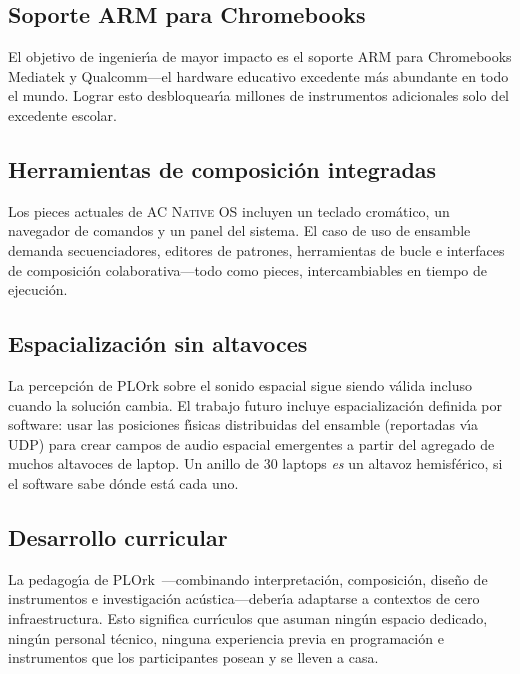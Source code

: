\documentclass[10pt,letterpaper,twocolumn]{article}
\newcommand{\acos}{\textsc{AC Native OS}}
\begin{document}
\subsection{Soporte ARM para Chromebooks}

El objetivo de ingenier\'{\i}a de mayor impacto es el soporte ARM para Chromebooks Mediatek y Qualcomm---el hardware educativo excedente m\'{a}s abundante en todo el mundo. Lograr esto desbloquear\'{\i}a millones de instrumentos adicionales solo del excedente escolar.

\subsection{Herramientas de composici\'{o}n integradas}

Los pieces actuales de \acos{} incluyen un teclado crom\'{a}tico, un navegador de comandos y un panel del sistema. El caso de uso de ensamble demanda secuenciadores, editores de patrones, herramientas de bucle e interfaces de composici\'{o}n colaborativa---todo como pieces, intercambiables en tiempo de ejecuci\'{o}n.

\subsection{Espacializaci\'{o}n sin altavoces}

La percepci\'{o}n de PLOrk sobre el sonido espacial sigue siendo v\'{a}lida incluso cuando la soluci\'{o}n cambia. El trabajo futuro incluye espacializaci\'{o}n definida por software: usar las posiciones f\'{\i}sicas distribuidas del ensamble (reportadas v\'{\i}a UDP) para crear campos de audio espacial emergentes a partir del agregado de muchos altavoces de laptop. Un anillo de 30 laptops \emph{es} un altavoz hemisf\'{e}rico, si el software sabe d\'{o}nde est\'{a} cada uno.

\subsection{Desarrollo curricular}

La pedagog\'{\i}a de PLOrk~\citep{trueman2007why}---combinando interpretaci\'{o}n, composici\'{o}n, dise\~{n}o de instrumentos e investigaci\'{o}n ac\'{u}stica---deber\'{\i}a adaptarse a contextos de cero infraestructura. Esto significa curr\'{\i}culos que asuman ning\'{u}n espacio dedicado, ning\'{u}n personal t\'{e}cnico, ninguna experiencia previa en programaci\'{o}n e instrumentos que los participantes posean y se lleven a casa.
\end{document}
